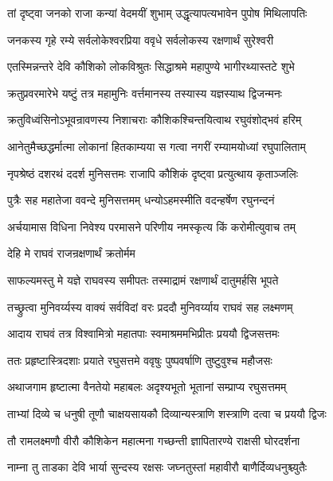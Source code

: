 \twolineshloka
{तां दृष्ट्वा जनको राजा कन्यां वेदमयीं शुभाम्}
{उद्धृत्यापत्यभावेन पुपोष मिथिलापतिः}%

\twolineshloka
{जनकस्य गृहे रम्ये सर्वलोकेश्वरप्रिया}
{ववृधे सर्वलोकस्य रक्षणार्थं सुरेश्वरी}%

\twolineshloka
{एतस्मिन्नन्तरे देवि कौशिको लोकविश्रुतः}
{सिद्धाश्रमे महापुण्ये भागीरथ्यास्तटे शुभे}%

\twolineshloka
{क्रतुप्रवरमारेभे यष्टुं तत्र महामुनिः}
{वर्त्तमानस्य तस्यास्य यज्ञस्याथ द्विजन्मनः}%

\twolineshloka
{क्रतुविध्वंसिनोऽभूवन्रावणस्य निशाचराः}
{कौशिकश्चिन्तयित्वाथ रघुवंशोद्भवं हरिम्}%

\twolineshloka
{आनेतुमैच्छद्धर्मात्मा लोकानां हितकाम्यया}
{स गत्वा नगरीं रम्यामयोध्यां रघुपालिताम्}%

\twolineshloka
{नृपश्रेष्ठं दशरथं ददर्श मुनिसत्तमः}
{राजापि कौशिकं दृष्ट्वा प्रत्युत्थाय कृताञ्जलिः}%

\twolineshloka
{पुत्रैः सह महातेजा ववन्दे मुनिसत्तमम्}
{धन्योऽहमस्मीति वदन्हर्षेण रघुनन्दनं}%

\twolineshloka
{अर्चयामास विधिना निवेश्य परमासने}
{परिणीय नमस्कृत्य किं करोमीत्युवाच तम्}%


\onelineshloka
{देहि मे राघवं राजन्रक्षणार्थं क्रतोर्मम}%

\twolineshloka
{साफल्यमस्तु मे यज्ञे राघवस्य समीपतः}
{तस्माद्रामं रक्षणार्थं दातुमर्हसि भूपते}%


\twolineshloka
{तच्छ्रुत्वा मुनिवर्य्यस्य वाक्यं सर्वविदां वरः}
{प्रददौ मुनिवर्य्याय राघवं सह लक्ष्मणम्}%

\twolineshloka
{आदाय राघवं तत्र विश्वामित्रो महातपाः}
{स्वमाश्रममभिप्रीतः प्रययौ द्विजसत्तमः}%

\twolineshloka
{ततः प्रहृष्टास्त्रिदशाः प्रयाते रघुसत्तमे}
{ववृषुः पुष्पवर्षाणि तुष्टुवुश्च महौजसः}%

\twolineshloka
{अथाजगाम हृष्टात्मा वैनतेयो महाबलः}
{अदृश्यभूतो भूतानां सम्प्राप्य रघुसत्तमम्}%

\twolineshloka
{ताभ्यां दिव्ये च धनुषी तूणौ चाक्षयसायकौ}
{दिव्यान्यस्त्राणि शस्त्राणि दत्वा च प्रययौ द्विजः}%

\twolineshloka
{तौ रामलक्ष्मणौ वीरौ कौशिकेन महात्मना}
{गच्छन्ती ज्ञापितारण्ये राक्षसी घोरदर्शना}%

\twolineshloka
{नाम्ना तु ताडका देवि भार्या सुन्दस्य रक्षसः}
{जघ्नतुस्तां महावीरौ बाणैर्दिव्यधनुश्च्युतैः}%

